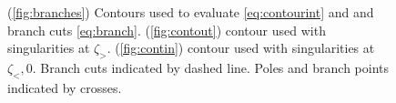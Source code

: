 \documentclass[12pt]{article}
\begin{document}
\begin{figure}
 \begin{center}
 \begin{myenuma}
  \item{}\label{fig:branches}
  \hspace{0.5cm}
  \item{}\label{fig:contout}
  \hspace{0.5cm}
  \item{}\label{fig:contin}
 \end{myenuma}
 \end{center}
  \caption{(\ref{fig:branches}) Contours used to evaluate \eqref{eq:contourint} and and branch cuts \eqref{eq:branch}.
  (\ref{fig:contout}) contour used with singularities at $\zeta_>$. 
  (\ref{fig:contin}) contour used with singularities at $\zeta_<,0$.
  Branch cuts indicated by dashed line. 
  Poles and branch points indicated by crosses.}\label{fig:contours}
\end{figure}
\end{document}
